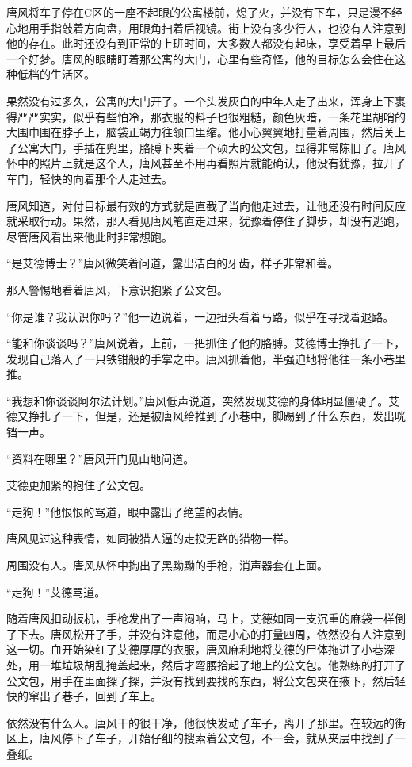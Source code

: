 唐风将车子停在C区的一座不起眼的公寓楼前，熄了火，并没有下车，只是漫不经心地用手指敲着方向盘，用眼角扫着后视镜。街上没有多少行人，也没有人注意到他的存在。此时还没有到正常的上班时间，大多数人都没有起床，享受着早上最后一个好梦。唐风的眼睛盯着那公寓的大门，心里有些奇怪，他的目标怎么会住在这种低档的生活区。

果然没有过多久，公寓的大门开了。一个头发灰白的中年人走了出来，浑身上下裹得严严实实，似乎有些怕冷，那衣服的料子也很粗糙，颜色灰暗，一条花里胡哨的大围巾围在脖子上，脑袋正竭力往领口里缩。他小心翼翼地打量着周围，然后关上了公寓大门，手插在兜里，胳膊下夹着一个硕大的公文包，显得非常陈旧了。唐风怀中的照片上就是这个人，唐风甚至不用再看照片就能确认，他没有犹豫，拉开了车门，轻快的向着那个人走过去。

唐风知道，对付目标最有效的方式就是直截了当向他走过去，让他还没有时间反应就采取行动。果然，那人看见唐风笔直走过来，犹豫着停住了脚步，却没有逃跑，尽管唐风看出来他此时非常想跑。

“是艾德博士？”唐风微笑着问道，露出洁白的牙齿，样子非常和善。

那人警惕地看着唐风，下意识抱紧了公文包。

“你是谁？我认识你吗？”他一边说着，一边扭头看着马路，似乎在寻找着退路。

“能和你谈谈吗？”唐风说着，上前，一把抓住了他的胳膊。艾德博士挣扎了一下，发现自己落入了一只铁钳般的手掌之中。唐风抓着他，半强迫地将他往一条小巷里推。

“我想和你谈谈阿尔法计划。”唐风低声说道，突然发现艾德的身体明显僵硬了。艾德又挣扎了一下，但是，还是被唐风给推到了小巷中，脚踢到了什么东西，发出咣铛一声。

“资料在哪里？”唐风开门见山地问道。

艾德更加紧的抱住了公文包。

“走狗！”他恨恨的骂道，眼中露出了绝望的表情。

唐风见过这种表情，如同被猎人逼的走投无路的猎物一样。

周围没有人。唐风从怀中掏出了黑黝黝的手枪，消声器套在上面。

“走狗！”艾德骂道。

随着唐风扣动扳机，手枪发出了一声闷响，马上，艾德如同一支沉重的麻袋一样倒了下去。唐风松开了手，并没有注意他，而是小心的打量四周，依然没有人注意到这一切。血开始染红了艾德厚厚的衣服，唐风麻利地将艾德的尸体拖进了小巷深处，用一堆垃圾胡乱掩盖起来，然后才弯腰拾起了地上的公文包。他熟练的打开了公文包，用手在里面探了探，并没有找到要找的东西，将公文包夹在掖下，然后轻快的窜出了巷子，回到了车上。

依然没有什么人。唐风干的很干净，他很快发动了车子，离开了那里。在较远的街区上，唐风停下了车子，开始仔细的搜索着公文包，不一会，就从夹层中找到了一叠纸。

